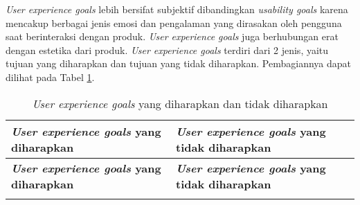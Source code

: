 \textit{User experience goals} lebih bersifat subjektif dibandingkan \textit{usability goals} karena mencakup berbagai jenis emosi dan pengalaman yang dirasakan oleh pengguna saat berinteraksi dengan produk. \textit{User experience goals} juga berhubungan erat dengan estetika dari produk. \textit{User experience goals} terdiri dari 2 jenis, yaitu tujuan yang diharapkan dan tujuan yang tidak diharapkan. \parencite{PreeceRogersSharp15} Pembagiannya dapat dilihat pada Tabel \ref{tab:ux_goals}.

\newpage

\RaggedLeft
\begin{footnotesize}
\begin{longtable}[c]{|>{\cbnormspacing}m{}|>{\cbnormspacing}m{}|}
  \caption{\textit{User experience goals} yang diharapkan dan tidak diharapkan}
  \label{tab:ux_goals} \\
  \hline \rowcolor[HTML]{A3E5F5}
  \centering\textbf{\textit{User experience goals} yang diharapkan} & \textbf{\textit{User experience goals} yang tidak diharapkan} \\ \hline \endfirsthead
  \hline \rowcolor[HTML]{A3E5F5}
  \centering\textbf{\textit{User experience goals} yang diharapkan} & \textbf{\textit{User experience goals} yang tidak diharapkan} \\ \hline \endhead
  
  \hline \endfoot
  

\end{longtable}
\end{footnotesize}
